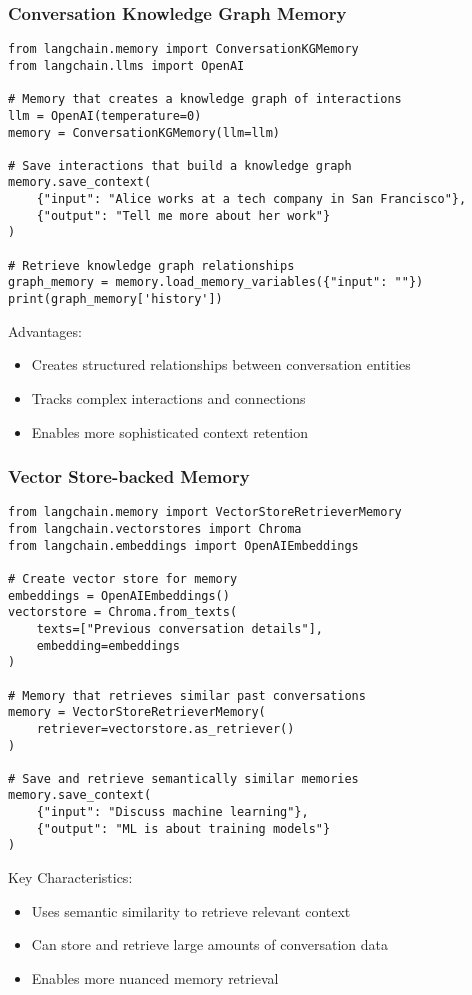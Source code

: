 \begin{frame}[fragile]\frametitle{Conversation Knowledge Graph Memory}

\begin{lstlisting}
from langchain.memory import ConversationKGMemory
from langchain.llms import OpenAI

# Memory that creates a knowledge graph of interactions
llm = OpenAI(temperature=0)
memory = ConversationKGMemory(llm=llm)

# Save interactions that build a knowledge graph
memory.save_context(
    {"input": "Alice works at a tech company in San Francisco"},
    {"output": "Tell me more about her work"}
)

# Retrieve knowledge graph relationships
graph_memory = memory.load_memory_variables({"input": ""})
print(graph_memory['history'])
\end{lstlisting}

Advantages:
\begin{itemize}
\item Creates structured relationships between conversation entities
\item Tracks complex interactions and connections
\item Enables more sophisticated context retention
\end{itemize}

\end{frame}

\begin{frame}[fragile]\frametitle{Vector Store-backed Memory}

\begin{lstlisting}
from langchain.memory import VectorStoreRetrieverMemory
from langchain.vectorstores import Chroma
from langchain.embeddings import OpenAIEmbeddings

# Create vector store for memory
embeddings = OpenAIEmbeddings()
vectorstore = Chroma.from_texts(
    texts=["Previous conversation details"],
    embedding=embeddings
)

# Memory that retrieves similar past conversations
memory = VectorStoreRetrieverMemory(
    retriever=vectorstore.as_retriever()
)

# Save and retrieve semantically similar memories
memory.save_context(
    {"input": "Discuss machine learning"},
    {"output": "ML is about training models"}
)
\end{lstlisting}

Key Characteristics:
\begin{itemize}
\item Uses semantic similarity to retrieve relevant context
\item Can store and retrieve large amounts of conversation data
\item Enables more nuanced memory retrieval
\end{itemize}

\end{frame}

